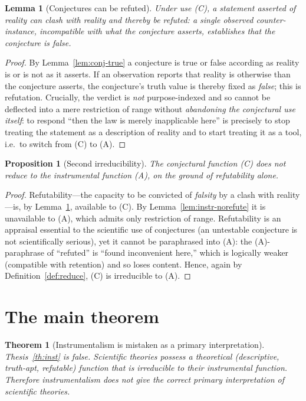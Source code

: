 \documentclass{amsart}
\theoremstyle{definition}
\theoremstyle{plain}
\newtheorem{lemma}{Lemma}
\newtheorem{proposition}{Proposition}
\newtheorem{theorem}{Theorem}
\begin{document}
\begin{lemma}[Conjectures can be refuted]\label{lem:conj-refute}
Under use \textup{(C)}, a statement asserted of reality \emph{can} clash with
reality and thereby be \emph{refuted}: a single observed counter-instance,
incompatible with what the conjecture asserts, establishes that the conjecture
is false.
\end{lemma}

\begin{proof}
By Lemma~\ref{lem:conj-true} a conjecture is true or false according as reality
is or is not as it asserts. If an observation reports that reality is otherwise
than the conjecture asserts, the conjecture's truth value is thereby fixed as
\emph{false}; this is refutation. Crucially, the verdict is \emph{not}
purpose-indexed and so cannot be deflected into a mere restriction of range
without \emph{abandoning the conjectural use itself}: to respond ``then the law
is merely inapplicable here'' is precisely to stop treating the statement as a
description of reality and to start treating it as a tool, i.e.\ to switch from
(C) to (A).
\end{proof}

\begin{proposition}[Second irreducibility]\label{prop:irred2}
The conjectural function \textup{(C)} does not reduce to the instrumental
function \textup{(A)}, on the ground of refutability alone.
\end{proposition}

\begin{proof}
Refutability---the capacity to be convicted of \emph{falsity} by a clash with
reality---is, by Lemma~\ref{lem:conj-refute}, available to (C). By
Lemma~\ref{lem:instr-norefute} it is unavailable to (A), which admits only
restriction of range. Refutability is an appraisal essential to the scientific
use of conjectures (an untestable conjecture is not scientifically serious),
yet it cannot be paraphrased into (A): the (A)-paraphrase of ``refuted'' is
``found inconvenient here,'' which is logically weaker (compatible with
retention) and so loses content. Hence, again by
Definition~\ref{def:reduce}, (C) is irreducible to (A).
\end{proof}

\section{The main theorem}

\begin{theorem}[Instrumentalism is mistaken as a primary
interpretation]\label{thm:main}
Thesis~\textup{\ref{th:inst}} is false. Scientific theories possess a
theoretical (descriptive, truth-apt, refutable) function that is irreducible to
their instrumental function. Therefore instrumentalism does not give the
correct primary interpretation of scientific theories.
\end{theorem}
\end{document}
